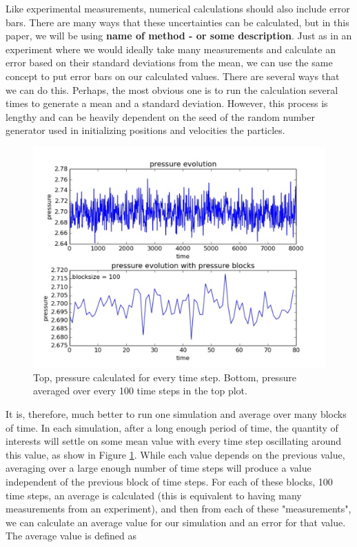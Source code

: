 \documentclass{article}
\begin{document}
\begin{multicols}{2}
Like experimental measurements, numerical calculations should also include error bars.  There are many ways that these uncertainties can be calculated, but in this paper, we will be using \textbf{name of method - or some description}.  Just as in an experiment where we would ideally take many measurements and calculate an error based on their standard deviations from the mean, we can use the same concept to put error bars on our calculated values.  There are several ways that we can do this.  Perhaps, the most obvious one is to run the calculation several times to generate a mean and a standard deviation.  However, this process is lengthy and can be heavily dependent on the seed of the random number generator used in initializing positions and velocities the particles.  \\

\begin{figure}[H]
\begin{center}
\includegraphics[width=\linewidth]{plots/presn100lp10000T1rho088prt864.pdf}
\caption{Top, pressure calculated for every time step.  Bottom, pressure averaged over every 100 time steps in the top plot.  }
\label{errex}
\end{center}
\end{figure}

It is, therefore, much better to run one simulation and average over many blocks of time.  In each simulation, after a long enough period of time, the quantity of interests will settle on some mean value with every time step oscillating around this value, as show in Figure \ref{errex}.  While each value depends on the previous value, averaging over a large enough number of time steps will produce a value independent of the previous block of time steps.  For each of these blocks, 100 time steps, an average is calculated (this is equivalent to having many measurements from an experiment), and then from each of these "measurements", we can calculate an average value for our simulation and an error for that value.  The average value is defined as 


\end{multicols}
\end{document}
